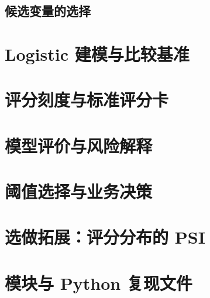 \documentclass[UTF8,12pt,a4paper,fontset=windows]{ctexart}
\begin{document}
\subsection{候选变量的选择}
\label{sec:feature-selection}


\section{Logistic 建模与比较基准}
\label{sec:logistic}


\section{评分刻度与标准评分卡}
\label{sec:scorecard}


\section{模型评价与风险解释}
\label{sec:model-evaluation}


\section{阈值选择与业务决策}
\label{sec:decision-thresholds}


\section{选做拓展：评分分布的 PSI}
\label{sec:score-psi}


\appendix
\section{模块与 Python 复现文件}
\label{app:python-files}

\end{document}
